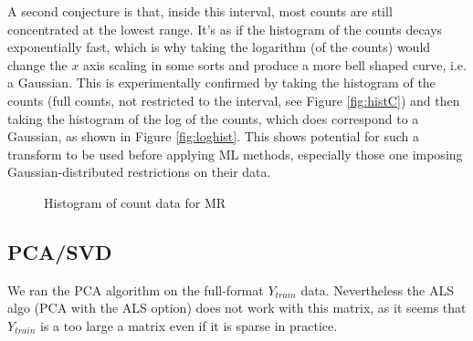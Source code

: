 \documentclass{article} %
\begin{document}
A second conjecture is that, inside this interval, most counts are still concentrated at the lowest range. It’s as if the histogram of the counts decays exponentially fast, which is why taking the logarithm (of the counts) would change the $x$ axis scaling in some sorts and produce a more bell shaped curve, i.e. a Gaussian. This is experimentally confirmed by taking the histogram of the counts (full counts, not restricted to the interval, see Figure \ref{fig:histC}) and then taking the histogram of the log of the counts, which does correspond to a Gaussian, as shown in Figure \ref{fig:loghist}. This shows potential for such a transform to be used before applying ML methods, especially those one imposing Gaussian-distributed restrictions on their data.
\begin{figure}
\centering     %
{}
\caption{Histogram of count data for MR}
\end{figure}


\subsection{PCA/SVD}
We ran the PCA algorithm on the full-format $Y_{train}$ data. Nevertheless the ALS algo (PCA with the ALS option) does not work with this matrix, as it seems that $Y_{train}$ is a too large a matrix even if it is sparse in practice.
\end{document}
